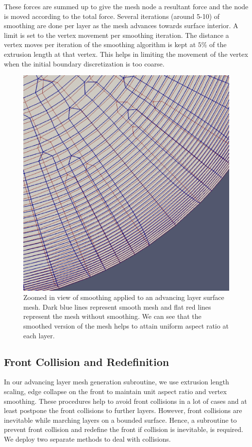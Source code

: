 \documentclass[conf]{new-aiaa}
\begin{document}
These forces are summed up to give the mesh node a resultant force and the node is moved according to the total force. Several iterations (around 5-10) of smoothing are done per layer as the mesh advances towards surface interior. A limit is set to the vertex movement per smoothing iteration. The distance a vertex moves per iteration of the smoothing algorithm is kept at $5\%$ of the extrusion length at that vertex. This helps in limiting the movement of the vertex when the initial boundary discretization is too coarse.

\begin{figure}
\centering
\includegraphics[scale=0.3]{smoothing/smoothing-comparison-cylinder-cap.eps}
\caption{Zoomed in view of smoothing applied to an advancing layer surface mesh. Dark blue lines represent smooth mesh and flat red lines represent the mesh without smoothing. We can see that the smoothed version of the mesh helps to attain uniform aspect ratio at each layer.}
\label{fig-smoothing-cylinder}
\end{figure}


\subsection{Front Collision and Redefinition}
In our advancing layer mesh generation subroutine, we use extrusion length scaling, edge collapse on the front to maintain unit aspect ratio and vertex smoothing. These procedures help to avoid front collisions in a lot of cases and at least postpone the front collisions to further layers. However, front collisions are inevitable while marching layers on a bounded surface. Hence, a subroutine to prevent front collision and redefine the front if collision is inevitable, is required. We deploy two separate methods to deal with collisions.
\end{document}
